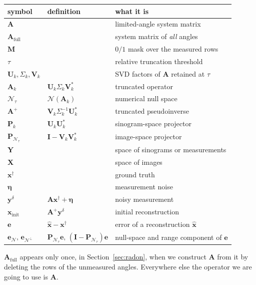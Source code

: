 \documentclass{article}
\numberwithin{equation}{section}
\begin{document}
\begin{center}
\begin{tabular}{lll}
\toprule
symbol & definition & what it is \\
\midrule
$\mathbf{A}$ & & limited-angle system matrix \\
$\mathbf{A}_\text{full}$ & & system matrix of \emph{all} angles \\
$\mathbf{M}$ & & $0/1$ mask over the measured rows \\
$\tau$ & & relative truncation threshold \\
$\mathbf{U}_k,\Sigma_k,\mathbf{V}_k$ & & SVD factors of $\mathbf{A}$ retained at $\tau$ \\
$\mathbf{A}_k$ & $\mathbf{U}_k\Sigma_k\mathbf{V}_k^{*}$ & truncated operator \\
$\mathcal{N}_\tau$ & $\mathcal{N}(\mathbf{A}_k)$ & numerical null space \\
$\mathbf{A}^{+}$ & $\mathbf{V}_k\Sigma_k^{-1}\mathbf{U}_k^{*}$ & truncated pseudoinverse \\
$\mathbf{P}_k$ & $\mathbf{U}_k\mathbf{U}_k^{*}$ & sinogram-space projector \\
$\mathbf{P}_{\mathcal{N}_\tau}$ & $\mathbf{I}-\mathbf{V}_k\mathbf{V}_k^{*}$ & image-space projector \\
$\mathbf{Y}$& &space of sinograms or measurements\\
$\mathbf{X}$& &space of images\\
$\mathbf{x}^\dagger$ & & ground truth \\
$\boldsymbol{\eta}$ & & measurement noise \\
$\mathbf{y}^\delta$ & $\mathbf{A}\mathbf{x}^\dagger+\boldsymbol{\eta}$ & noisy measurement \\
$\mathbf{x}_\text{init}$ & $\mathbf{A}^{+}\mathbf{y}^\delta$ & initial reconstruction \\
$\mathbf{e}$ & $\hat{\mathbf{x}}-\mathbf{x}^\dagger$ & error of a reconstruction $\hat{\mathbf{x}}$ \\
$\mathbf{e}_{\mathcal{N}},\,\mathbf{e}_{\mathcal{N}^\perp}$ & $\mathbf{P}_{\mathcal{N}_\tau}\mathbf{e},\,(\mathbf{I}-\mathbf{P}_{\mathcal{N}_\tau})\mathbf{e}$ & null-space and range component of $\mathbf{e}$ \\
\bottomrule
\end{tabular}
\end{center}
\noindent
$\mathbf{A}_\text{full}$ appears only once, in Section~\ref{sec:radon}, when we construct
$\mathbf{A}$ from it by deleting the rows of the unmeasured
angles. Everywhere else the operator we are going to use is $\mathbf{A}$.\\
\end{document}
